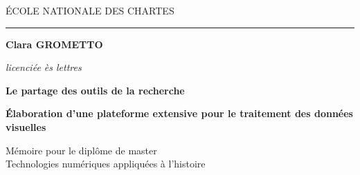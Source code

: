 \begin{titlepage}
    \begin{center}
        
        \bigskip
        
        \begin{large}
            ÉCOLE NATIONALE DES CHARTES
        \end{large}
        \begin{center}\rule{2cm}{0.02cm}\end{center}
        
        \bigskip
        \bigskip
        \bigskip
        \begin{Large}
            \textbf{Clara GROMETTO}\\
        \end{Large}
        \begin{normalsize} \textit{licenciée ès lettres}\\
        \end{normalsize}
        
        \bigskip
        \bigskip
        \bigskip
        
        \begin{Huge}
            \textbf{Le partage des outils de la recherche}\\
        \end{Huge}
        \bigskip
        \bigskip
        \begin{LARGE}
            \textbf{Élaboration d'une plateforme extensive pour le traitement des données visuelles}\\
        \end{LARGE}
        
        \bigskip
        \bigskip
        \bigskip
        \begin{large}
        \end{large}
        \vfill
        
        \begin{large}
            Mémoire 
            pour le diplôme de master \\
            \og Technologies numériques appliquées à l'histoire~\fg\\
        \end{large}
        
    \end{center}
\end{titlepage}